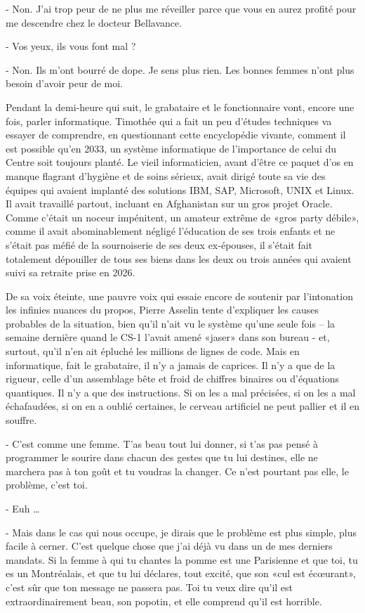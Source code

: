 - Non. J’ai trop peur de ne plus me réveiller parce que vous en aurez profité pour me descendre chez le docteur Bellavance.

- Vos yeux, ils vous font mal ?

- Non. Ils m’ont bourré de dope. Je sens plus rien. Les bonnes femmes n’ont plus besoin d’avoir peur de moi.

Pendant la demi-heure qui suit, le grabataire et le fonctionnaire vont, encore une fois, parler informatique. Timothée qui a fait un peu d’études techniques va essayer de comprendre, en questionnant cette encyclopédie vivante, comment il est possible qu’en 2033, un système informatique de l’importance de celui du Centre soit toujours planté. Le vieil informaticien, avant d’être ce paquet d’os en manque flagrant d’hygiène et de soins sérieux, avait dirigé toute sa vie des équipes qui avaient implanté des solutions IBM, SAP, Microsoft, UNIX et Linux. Il avait travaillé partout, incluant en Afghanistan sur un gros projet Oracle. Comme c’était un noceur impénitent, un amateur extrême de «gros party débile», comme il avait abominablement négligé l’éducation de ses trois enfants et ne s’était pas méfié de la sournoiserie de ses deux ex-épouses, il s’était fait totalement dépouiller de tous ses biens dans les deux ou trois années qui avaient suivi sa retraite prise en 2026.

De sa voix éteinte, une pauvre voix qui essaie encore de soutenir par l’intonation les infinies nuances du propos, Pierre Asselin tente d’expliquer les causes probables de la situation, bien qu’il n’ait vu le système qu’une seule fois – la semaine dernière quand le CS-1 l’avait amené «jaser» dans son bureau - et, surtout, qu’il n’en ait épluché les millions de lignes de code. Mais en informatique, fait le grabataire, il n’y a jamais de caprices. Il n’y a que de la rigueur, celle d’un assemblage bête et froid de chiffres binaires ou d’équations quantiques. Il n’y a que des instructions. Si on les a mal précisées, si on les a mal échafaudées, si on en a oublié certaines, le cerveau artificiel ne peut pallier et il en souffre.

- C’est comme une femme. T’as beau tout lui donner, si t’as pas pensé à programmer le sourire dans chacun des gestes que tu lui destines, elle ne marchera pas à ton goût et tu voudras la changer. Ce n’est pourtant pas elle, le problème, c’est toi.

- Euh …

- Mais dans le cas qui nous occupe, je dirais que le problème est plus simple, plus facile à cerner. C’est quelque chose que j’ai déjà vu dans un de mes derniers mandats. Si la femme à qui tu chantes la pomme est une Parisienne et que toi, tu es un Montréalais, et que tu lui déclares, tout excité, que son «cul est écœurant», c’est sûr que ton message ne passera pas. Toi tu veux dire qu’il est extraordinairement beau, son popotin, et elle comprend qu’il est horrible.

